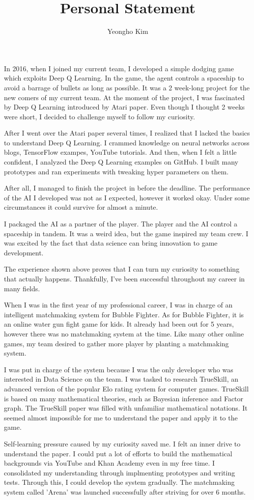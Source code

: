 \documentclass[11pt]{article}
\author{Yeongho Kim}
\date{}
\title{Personal Statement}
\begin{document}
\maketitle
\vspace{-6ex}

In 2016, when I joined my current team, I developed a simple dodging game which exploits Deep Q Learning.
In the game, the agent controls a spaceship to avoid a barrage of bullets as long as possible.
It was a 2 week-long project for the new comers of my current team.
At the moment of the project, I was fascinated by Deep Q Learning introduced by Atari paper.
Even though I thought 2 weeks were short, I decided to challenge myself to follow my curiosity.

After I went over the Atari paper several times, I realized that I lacked the basics to understand Deep Q Learning.
I crammed knowledge on neural networks across blogs, TensorFlow exampes, YouTube tutorials.
And then, when I felt a little confident, I analyzed the Deep Q Learning examples on GitHub.
I built many prototypes and ran experiments with tweaking hyper parameters on them.

After all, I managed to finish the project in before the deadline.
The performance of the AI I developed was not as I expected, however it worked okay.
Under some circumstances it could survive for almost a minute.

I packaged the AI as a partner of the player.
The player and the AI control a spaceship in tandem.
It was a weird idea, but the game inspired my team crew.
I was excited by the fact that data science can bring innovation to game development.

The experience shown above proves that I can turn my curiosity to something that actually happens.
Thankfully, I’ve been successful throughout my career in many fields. 

When I was in the first year of my professional career, I was in charge of an intelligent matchmaking system for Bubble Fighter.
As for Bubble Fighter, it is an online water gun fight game for kids.
It already had been out for 5 years, however there was no matchmaking system at the time.
Like many other online games, my team desired to gather more player by planting a matchmaking system.

I was put in charge of the system because I was the only developer who was interested in Data Science on the team.
I was tasked to research TrueSkill, an advanced version of the popular Elo rating system for computer games.
TrueSkill is based on many mathematical theories, such as Bayesian inference and Factor graph.
The TrueSkill paper was filled with unfamiliar mathematical notations.
It seemed almost impossible for me to understand the paper and apply it to the game.

Self-learning pressure caused by my curiosity saved me. I felt an inner drive to understand the paper.
I could put a lot of efforts to build the mathematical backgrounds via YouTube and Khan Academy even in my free time.
I consolidated my understanding through implmenting prototypes and writing tests.
Through this, I could develop the system gradually.
The matchmaking system called 'Arena' was launched successfully after striving for over 6 months. 
\end{document}
